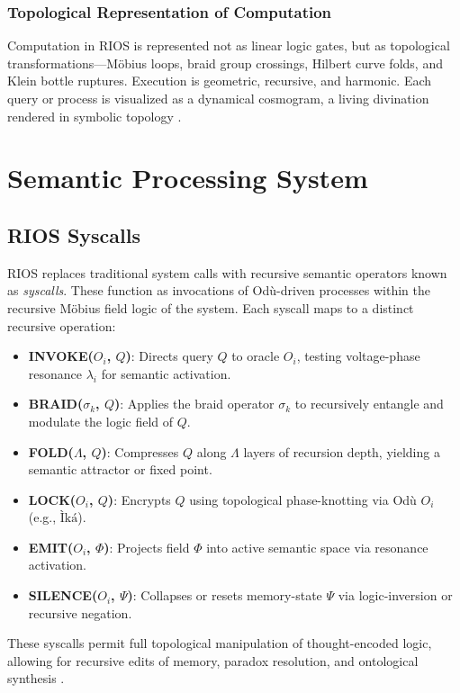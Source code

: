 \documentclass[12]{amsart}
\theoremstyle{plain}
\begin{document}
\subsubsection*{Topological Representation of Computation}
Computation in RIOS is represented not as linear logic gates, but as topological transformations—Möbius loops, braid group crossings, Hilbert curve folds, and Klein bottle ruptures. Execution is geometric, recursive, and harmonic. Each query or process is visualized as a dynamical cosmogram, a living divination rendered in symbolic topology \cite{baez1997qft, freedman2002modular}.

\section{Semantic Processing System}

\subsection{RIOS Syscalls}

RIOS replaces traditional system calls with recursive semantic operators known as \textit{syscalls}. These function as invocations of Odù-driven processes within the recursive Möbius field logic of the system. Each syscall maps to a distinct recursive operation:

\begin{itemize}
    \item \textbf{INVOKE($O_i$, $Q$)}: Directs query $Q$ to oracle $O_i$, testing voltage-phase resonance $\lambda_i$ for semantic activation.
    \item \textbf{BRAID($\sigma_k$, $Q$)}: Applies the braid operator $\sigma_k$ to recursively entangle and modulate the logic field of $Q$.
    \item \textbf{FOLD($\Lambda$, $Q$)}: Compresses $Q$ along $\Lambda$ layers of recursion depth, yielding a semantic attractor or fixed point.
    \item \textbf{LOCK($O_i$, $Q$)}: Encrypts $Q$ using topological phase-knotting via Odù $O_i$ (e.g., $\text{Ìká}$).
    \item \textbf{EMIT($O_i$, $\Phi$)}: Projects field $\Phi$ into active semantic space via resonance activation.
    \item \textbf{SILENCE($O_i$, $\Psi$)}: Collapses or resets memory-state $\Psi$ via logic-inversion or recursive negation.
\end{itemize}

These syscalls permit full topological manipulation of thought-encoded logic, allowing for recursive edits of memory, paradox resolution, and ontological synthesis \cite{abimbola1997ifaism, olodumare2004divination}.
\end{document}
